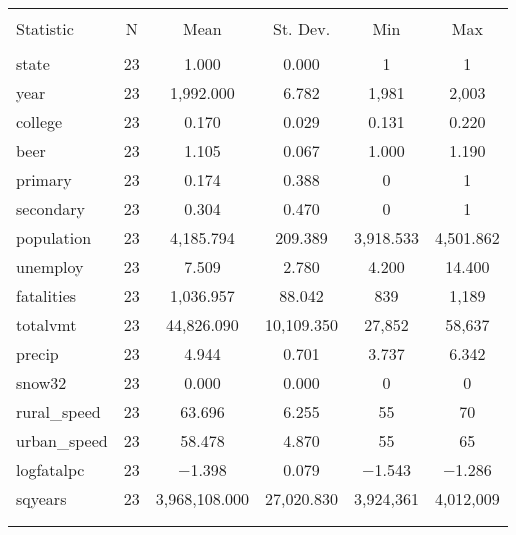 \documentclass{article}
\begin{document}
\begin{table}[!htbp] \centering 
  \caption{} 
  \label{} 
\begin{tabular}{@{\extracolsep{5pt}}lccccc} 
\\[-1.8ex]\hline 
\hline \\[-1.8ex] 
Statistic & \multicolumn{1}{c}{N} & \multicolumn{1}{c}{Mean} & \multicolumn{1}{c}{St. Dev.} & \multicolumn{1}{c}{Min} & \multicolumn{1}{c}{Max} \\ 
\hline \\[-1.8ex] 
state & 23 & 1.000 & 0.000 & 1 & 1 \\ 
year & 23 & 1,992.000 & 6.782 & 1,981 & 2,003 \\ 
college & 23 & 0.170 & 0.029 & 0.131 & 0.220 \\ 
beer & 23 & 1.105 & 0.067 & 1.000 & 1.190 \\ 
primary & 23 & 0.174 & 0.388 & 0 & 1 \\ 
secondary & 23 & 0.304 & 0.470 & 0 & 1 \\ 
population & 23 & 4,185.794 & 209.389 & 3,918.533 & 4,501.862 \\ 
unemploy & 23 & 7.509 & 2.780 & 4.200 & 14.400 \\ 
fatalities & 23 & 1,036.957 & 88.042 & 839 & 1,189 \\ 
totalvmt & 23 & 44,826.090 & 10,109.350 & 27,852 & 58,637 \\ 
precip & 23 & 4.944 & 0.701 & 3.737 & 6.342 \\ 
snow32 & 23 & 0.000 & 0.000 & 0 & 0 \\ 
rural\_speed & 23 & 63.696 & 6.255 & 55 & 70 \\ 
urban\_speed & 23 & 58.478 & 4.870 & 55 & 65 \\ 
logfatalpc & 23 & $-$1.398 & 0.079 & $-$1.543 & $-$1.286 \\ 
sqyears & 23 & 3,968,108.000 & 27,020.830 & 3,924,361 & 4,012,009 \\ 
\hline \\[-1.8ex] 
\normalsize 
\end{tabular} 
\end{table} 
\end{document}
